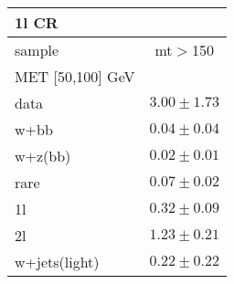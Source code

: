 \begin{table}
\begin{center}
\small
\begin{tabular}{lc}
\hline
1l CR & \\
\hline
sample&mt$>$150\\
\hline
MET [50,100] GeV &  \\
\hline
data&$3.00\pm1.73$\\
\hline
w+bb&$0.04\pm0.04$\\
w+z(bb)&$0.02\pm0.01$\\
rare&$0.07\pm0.02$\\
1l&$0.32\pm0.09$\\
2l&$1.23\pm0.21$\\
w+jets(light)&$0.22\pm0.22$\\
\hline
\hline\hline
\hline
\end{tabular}
\end{center}
\end{table}
